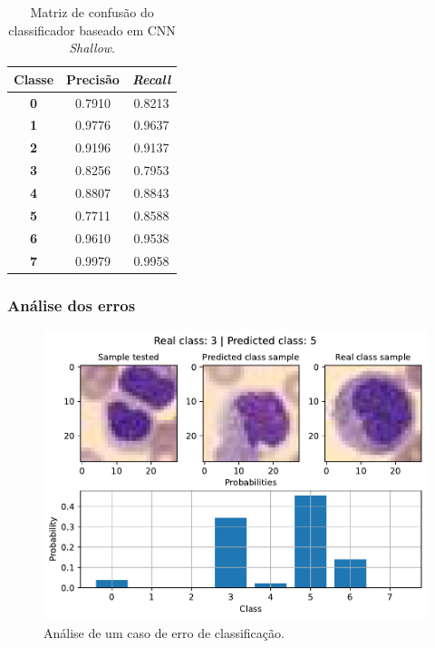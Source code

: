 \begin{table}[H]
	\centering
	\begin{tabular}{c|c|c}
		\textbf{Classe} & \textbf{Precisão} & \textit{\textbf{Recall}} \\ \hline
		\textbf{0}      & 0.7910            & 0.8213                   \\
		\textbf{1}      & 0.9776            & 0.9637                   \\
		\textbf{2}      & 0.9196            & 0.9137                   \\
		\textbf{3}      & 0.8256            & 0.7953                   \\
		\textbf{4}      & 0.8807            & 0.8843                   \\
		\textbf{5}      & 0.7711            & 0.8588                   \\
		\textbf{6}      & 0.9610            & 0.9538                   \\
		\textbf{7}      & 0.9979            & 0.9958                  
	\end{tabular}
	\caption{Matriz de confusão do classificador baseado em CNN \textit{Shallow}.}
	\label{tab:pr_CNN_shallow}
\end{table}

\subsubsection{Análise dos erros}



\begin{figure}[H]
\centering
\includegraphics[width=0.75\linewidth]{../../plot/cnn_shallow/error_analyser_1455}
\caption{Análise de um caso de erro de classificação.}
\label{fig:error_analyser_1455}
\end{figure}

